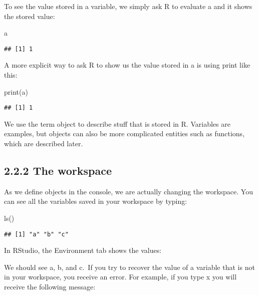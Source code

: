 \documentclass[
]{article}
\newenvironment{Shaded}{\begin{snugshade}}{\end{snugshade}}
\newcommand{\FunctionTok}[1]{\textcolor[rgb]{0.00,0.00,0.00}{#1}}
\newcommand{\NormalTok}[1]{#1}
\begin{document}
To see the value stored in a variable, we simply ask R to evaluate a and
it shows the stored value:

\begin{Shaded}
\begin{Highlighting}[]
\NormalTok{a}
\end{Highlighting}
\end{Shaded}

\begin{verbatim}
## [1] 1
\end{verbatim}

A more explicit way to ask R to show us the value stored in a is using
print like this:

\begin{Shaded}
\begin{Highlighting}[]
\FunctionTok{print}\NormalTok{(a)}
\end{Highlighting}
\end{Shaded}

\begin{verbatim}
## [1] 1
\end{verbatim}

We use the term object to describe stuff that is stored in R. Variables
are examples, but objects can also be more complicated entities such as
functions, which are described later.

\hypertarget{the-workspace}{%
\subsection{2.2.2 The workspace}\label{the-workspace}}

As we define objects in the console, we are actually changing the
workspace. You can see all the variables saved in your workspace by
typing:

\begin{Shaded}
\begin{Highlighting}[]
\FunctionTok{ls}\NormalTok{()}
\end{Highlighting}
\end{Shaded}

\begin{verbatim}
## [1] "a" "b" "c"
\end{verbatim}

In RStudio, the Environment tab shows the values:

We should see a, b, and c.~If you try to recover the value of a variable
that is not in your workspace, you receive an error. For example, if you
type x you will receive the following message:
\end{document}
